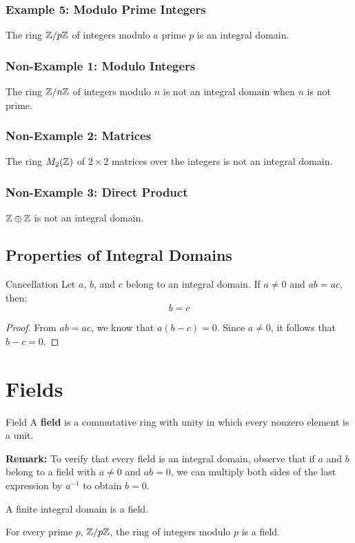 \documentclass[letterpaper]{article}
\begin{document}
\subsubsection{Example 5: Modulo Prime Integers}
The ring $\mathbb{Z} / p\mathbb{Z}$ of integers modulo $a$ prime $p$ is an integral domain. 

\subsubsection{Non-Example 1: Modulo Integers}
The ring $\mathbb{Z} / n\mathbb{Z}$ of integers modulo $n$ is not an integral domain when $n$ is not prime.

\subsubsection{Non-Example 2: Matrices}
The ring $M_{2}(\mathbb{Z})$ of $2 \times 2$ matrices over the integers is not an integral domain. 

\subsubsection{Non-Example 3: Direct Product}
$\mathbb{Z} \oplus \mathbb{Z}$ is not an integral domain. 


\subsection{Properties of Integral Domains}
\begin{theorem}{Cancellation}{}
    Let $a$, $b$, and $c$ belong to an integral domain. If $a \neq 0$ and $ab = ac$, then: 
    \[b = c\]
\end{theorem}
\begin{mdframed}[]
    \begin{proof}
        From $ab = ac$, we know that $a(b - c) = 0$. Since $a \neq 0$, it follows that $b - c = 0$.
    \end{proof}
\end{mdframed}

\section{Fields}

\begin{definition}{Field}{}
    A \textbf{field} is a commutative ring with unity in which every nonzero element is a unit.
\end{definition}
\textbf{Remark:} To verify that every field is an integral domain, observe that if $a$ and $b$ belong to a field with $a \neq 0$ and $ab = 0$, we can multiply both sides of the last expression by $a^{-1}$ to obtain $b = 0$.

\begin{theorem}{}{}
    A finite integral domain is a field.
\end{theorem}

\begin{corollary}{}{}
    For every prime $p$, $\mathbb{Z} / p \mathbb{Z}$, the ring of integers modulo $p$ is a field.
\end{corollary}
\end{document}
